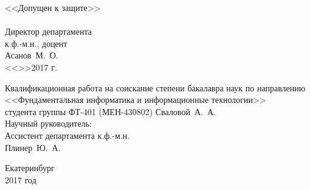 \documentclass[12pt]{article}
\begin{document}
{		\hspace{-1cm}
		\begin{minipage}{80mm}
			\noindent
			\vspace{-2.3cm}
			\begin{flushleft}
				\begin{spacing}{1.0}
				\large <<Допущен к защите>>\\
				\underline{\hspace{6cm}}\\
				\large Директор департамента\\
				\large к.ф.-м.н., доцент\\
				\large Асанов~М.~О.
				\underline{\hspace{6cm}}\\
				<<\underline{\hspace{0.7cm}}>>\underline{\hspace{3cm}}2017 г.
				\end{spacing}
			\end{flushleft}
		\end{minipage}
		\begin{minipage}{90mm}
			\begin{flushleft}
				\begin{spacing}{1.0}
				\large Квалификационная работа на соискание степени бакалавра наук по направлению\\
				\large <<Фундаментальная информатика и информационные технологии>>\\
				\large студента группы ФТ-401 (МЕН-430802) Сваловой~А.~А.\\
				\large Научный руководитель:\\
				\large Ассистент департамента к.ф.-м.н.\\
				\large Плинер~Ю.~А.
				\end{spacing}
			\end{flushleft}
		\end{minipage}
		
		\vfill
		
		\begin{center}
			Екатеринбург\\
			2017 год
		\end{center}
	}

	\newpage
	
	{\pagestyle{plain}
		\tableofcontents
	}

	\newpage
	
\end{document}
